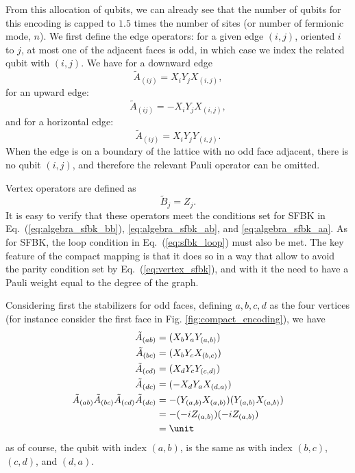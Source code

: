 From this allocation of qubits, we can already see that the number of qubits for this encoding is capped to $1.5$ times the number of sites (or number of fermionic mode, $n$). We first define the edge operators: for a given edge $(i, j)$, oriented $i$ to $j$, at most one of the adjacent faces is odd, in which case we index the related qubit with $(i, j)$. We have for a downward edge  \begin{equation}
    \tilde{A}_{(ij)} = X_i Y_j X_{(i,j)},
\end{equation}
for an upward edge: 
\begin{equation}
    \tilde{A}_{(ij)} = - X_i Y_j X_{(i,j)},
\end{equation}
and for a horizontal edge:
\begin{equation}
    \tilde{A}_{(ij)} = X_i Y_j Y_{(i,j)}.
\end{equation}
When the edge is on a boundary of the lattice with no odd face adjacent, there is no qubit $(i,j)$, and therefore the relevant Pauli operator can be omitted. 

Vertex operators are defined as
\begin{equation}
    \tilde{B}_{j} = Z_j.
\end{equation}
It is easy to verify that these operators meet the conditions set for SFBK in Eq.~(\ref{eq:algebra_sfbk_bb}), \ref{eq:algebra_sfbk_ab}, and \ref{eq:algebra_sfbk_aa}. As for SFBK, the loop condition in Eq.~(\ref{eq:sfbk_loop}) must also be met. The key feature of the compact mapping is that it does so in a way that allow to avoid the parity condition set by Eq.~(\ref{eq:vertex_sfbk}), and with it the need to have a Pauli weight equal to the degree of the graph. 

Considering first the stabilizers for odd faces, defining $a,b,c, d$ as the four vertices (for instance consider the first face in Fig. \ref{fig:compact_encoding}), we have 
\begin{align}
    \tilde{A}_{(ab)} & = (X_bY_aY_{(a,b)}) \\ \nonumber
    \tilde{A}_{(bc)} & = (X_bY_cX_{(b,c)}) \\ \nonumber
    \tilde{A}_{(cd)} &=  (X_dY_cY_{(c,d)}) \\ \nonumber
    \tilde{A}_{(dc)} &= (-X_dY_aX_{(d,a)})   \\ \nonumber
    \tilde{A}_{(ab)}\tilde{A}_{(bc)}\tilde{A}_{(cd)}\tilde{A}_{(dc)} &= - (Y_{(a,b)}X_{(a,b)})(Y_{(a,b)}X_{(a,b)}) \\ \nonumber
    & = - (-iZ_{(a,b)})(-iZ_{(a,b)}) \\ \nonumber
    &= \unit
\end{align}
as of course, the qubit with index $(a, b)$, is the same as with index $(b, c)$, $(c, d)$, and $(d, a)$.

